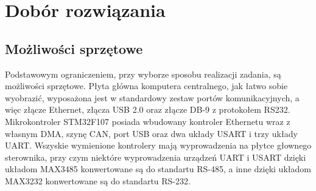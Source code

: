 \documentclass[a4paper, 12pt]{article}
\begin{document}
	\section{Dobór rozwiązania}
	\subsection{Możliwości sprzętowe}
	Podstawowym ograniczeniem, przy wyborze sposobu realizacji zadania, są możliwości sprzętowe. Płyta główna komputera centralnego, jak łatwo sobie wyobrazić, wyposażona jest w standardowy zestaw portów komunikacyjnych, a więc złącze Ethernet, złącza USB 2.0 oraz złącze DB-9 z protokołem RS232. Mikrokontroler STM32F107 posiada wbudowany kontroler Ethernetu wraz z własnym DMA, szynę CAN, port USB oraz dwa układy USART i trzy układy UART. Wszyskie wymienione kontrolery mają wyprowadzenia na płytce głownego sterownika, przy czym niektóre wyprowadzenia urządzeń UART i USART dzięki układom MAX3485 konwertowane są do standartu RS-485, a inne dzięki układom MAX3232 konwertowane są do standartu RS-232.
\end{document}
